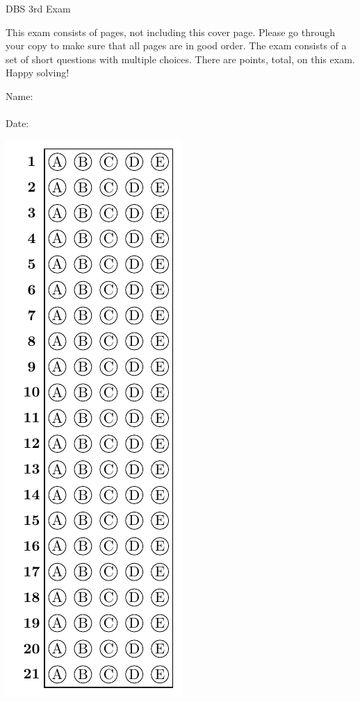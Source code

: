 \documentclass[11pt, addpoints, answers]{exam}\usepackage[utf8]{inputenc}
\begin{document}
	
	\begin{coverpages}
		\begin{center}
			\begin{Large}
				\vspace{-5mm}
				DBS 3rd Exam
			\end{Large}
		\end{center}
		\vspace{5mm}

		\begin{MyBox}
			This exam consists of \numpages{} pages, not including this cover page.  Please go through your copy to make sure that all pages are in good order.  The exam consists of a set of short questions with multiple choices. There are \numpoints{} points, total, on this exam. \\
			Happy solving!
		\end{MyBox}

		\vspace{10mm}
		\noindent
		Name:\enspace\hrulefill \\
		\\
		Date:\enspace\hrulefill
		\vspace{5mm}
		\begin{center}
			\includegraphics{../answer_table}


\end{center}
\end{coverpages}
\end{document}
